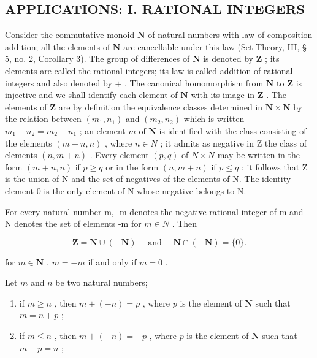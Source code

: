 \subsection{APPLICATIONS: I. RATIONAL INTEGERS}

Consider the commutative monoid \(\mathbf{N}\) of natural numbers with law of composition addition; all the elements of \(\mathbf{N}\) are cancellable under this law (Set Theory, III, § 5, no. 2, Corollary 3). The group of differences of \(\mathbf{N}\) is denoted by \(\mathbf{Z}\) ; its elements are called the rational integers; its law is called addition of rational integers and also denoted by \(+\) . The canonical homomorphism from \(\mathbf{N}\) to \(\mathbf{Z}\) is injective and we shall identify each element of \(\mathbf{N}\) with its image in \(\mathbf{Z}\) . The elements of \(\mathbf{Z}\) are by definition the equivalence classes determined in \(\mathbf{N} \times \mathbf{N}\) by the relation between \((m_1, n_1)\) and \((m_2, n_2)\) which is written \(m_1 + n_2 = m_2 + n_1\) ; an element \(m\) of \(\mathbf{N}\) is identified with the class consisting of the elements \((m + n, n)\) , where \(n \in N\) ; it admits as negative in Z the class of elements \((n, m + n)\) . Every element \((p, q)\) of \(N \times N\) may be written in the form \((m + n, n)\) if \(p \geqslant q\) or in the form \((n, m + n)\) if \(p \leqslant q\) ; it follows that Z is the union of N and the set of negatives of the elements of N. The identity element 0 is the only element of N whose negative belongs to N.

For every natural number m, -m denotes the negative rational integer of m and -N denotes the set of elements -m for \(m \in N\) . Then

\[
\mathbf {Z} = \mathbf {N} \cup (- \mathbf {N}) \quad \text { and } \quad \mathbf {N} \cap (- \mathbf {N}) = \{0 \}.
\]

for \(m \in \mathbf{N}\) , \(m = -m\) if and only if \(m = 0\) .

Let \(m\) and \(n\) be two natural numbers;

\begin{enumerate}
\def\labelenumi{(\alph{enumi})}
\item
  if \(m \geqslant n\) , then \(m + (-n) = p\) , where \(p\) is the element of \(\mathbf{N}\) such that \(m = n + p\) ;
\item
  if \(m \leqslant n\) , then \(m + (-n) = -p\) , where \(p\) is the element of \(\mathbf{N}\) such that \(m + p = n\) ;
\end{enumerate}

